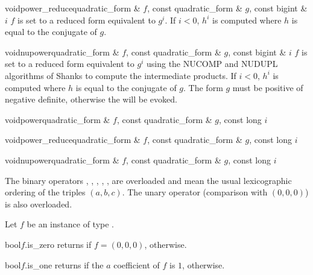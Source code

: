 \begin{fcode}{void}{power_reduce}{quadratic_form & $f$, const quadratic_form & $g$, const bigint & $i$}
  $f$ is set to a reduced form equivalent to $g^i$.  If $i < 0$, $h^i$ is computed where $h$ is
  equal to the conjugate of $g$.
\end{fcode}

\begin{fcode}{void}{nupower}{quadratic_form & $f$, const quadratic_form & $g$, const bigint & $i$}
  $f$ is set to a reduced form equivalent to $g^i$ using the NUCOMP and NUDUPL algorithms of
  Shanks \cite{Cohen:1995} to compute the intermediate products.  If $i < 0$, $h^i$ is computed
  where $h$ is equal to the conjugate of $g$.  The form $g$ must be positive of negative
  definite, otherwise the \LEH will be evoked.
\end{fcode}

\begin{fcode}{void}{power}{quadratic_form & $f$, const quadratic_form & $g$, const long $i$}
\end{fcode}

\begin{fcode}{void}{power_reduce}{quadratic_form & $f$, const quadratic_form & $g$, const long $i$}
\end{fcode}

\begin{fcode}{void}{nupower}{quadratic_form & $f$, const quadratic_form & $g$, const long $i$}
\end{fcode}



\COMP

The binary operators \code{<=}, \code{==}, \code{>=}, \code{!=}, \code{<}, \code{>} are
overloaded and mean the usual lexicographic ordering of the triples $(a,b,c)$.  The unary
operator \code{!} (comparison with $(0,0,0)$) is also overloaded.

Let $f$ be an instance of type .

\begin{cfcode}{bool}{$f$.is_zero}{}
  returns \TRUE if $f = (0,0,0)$, \FALSE otherwise.
\end{cfcode}

\begin{cfcode}{bool}{$f$.is_one}{}
  returns \TRUE if the $a$ coefficient of $f$ is $1$, \FALSE otherwise.
\end{cfcode}

